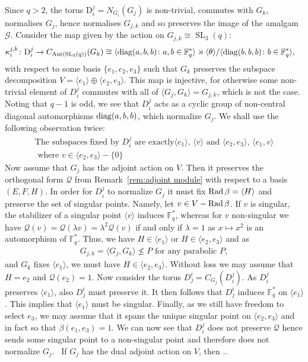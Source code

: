 \documentclass[12pt]{amsart}
\theoremstyle{definition}
\newcommand{\red}[1]{\,{\color{red} #1}\,}
\newcommand{\cQ}{{\mathcal Q}}
\newcommand{\Aut}{\mathop{\rm Aut}\nolimits}
\newcommand{\diag}{\mathop{\rm diag}\nolimits}
\newcommand{\Rad}{\mathop{\rm Rad}\nolimits}
\DeclareMathOperator{\SL}{SL}
\newcommand{\FF}{{\mathbb F}}
\newcommand{\comp}[1]{{\mathrm{#1}}}
\newcommand{\compG}{{{G}}}
\newcommand{\amG}{{\mathscr{G}}}
\begin{document}
Since $q>2$, the torus $\comp{D}_i^j=N_{\compG_{i}}(\compG_{j})$ is non-trivial, commutes with $\compG_{k}$, normalises $\compG_j$, hence normalises $\compG_{j,k}$ and so preserves the image of the amalgam $\amG$.
Consider the map given by the action on $\compG_{j,k}\cong \SL_3(q)$:
\begin{align*}
\kappa_i^{j,k}\colon \comp{D}_i^j & \to C_{\Aut(\SL_3(q))}(\compG_k) \cong  \langle \diag(a,b,b)\colon a,b\in \FF_q^*\rangle\rtimes \langle \theta \rangle/\langle \diag(b,b,b)\colon b\in \FF_q^*\rangle,
\end{align*}
with respect to some basis $\{e_1,e_2,e_3\}$ such that $\compG_k$ preserves the subspace decomposition $V=\langle e_1\rangle\oplus \langle e_2,e_3\rangle$.
This map is injective, for otherwise some non-trivial element of $D_i^j$ commutes with all of $\langle \compG_j,\compG_k\rangle=\compG_{j,k}$, which is not the case. Noting that $q-1$ is odd, we see that 
 $D_i^j$ acts as a cyclic group of non-central diagonal automorphisms $\diag(a,b,b)$, which normalize $\compG_j$.
We shall use the following observation twice:
\begin{align}
\mbox{The subspaces fixed by  $D_i^j$ are exactly
$\langle e_1\rangle$, $\langle v\rangle$  and 
 $\langle e_2,e_3\rangle$, $\langle e_1,v\rangle$} 
 \label{eqn:D_i^j fixed points and lines}\\
  \mbox{ where $v\in \langle e_2,e_3\rangle-\{0\}$} \nonumber
 \end{align}
Now assume that $\compG_j$ has the adjoint action on $V$.
Then it preserves the orthogonal form $\cQ$ from Remark~\ref{rem:adjoint module} with respect to a basis $(E,F,H)$.
In order for $D_i^j$ to normalize $\compG_j$ it must fix $\Rad \beta=\langle H\rangle$
 and preserve the set of singular points.
Namely, let $v\in V-\Rad\beta$.
If $v$ is singular, the stabilizer of a singular point $\langle v\rangle$ induces $\FF_q^*$, whereas
 for $v$ non-singular we have $\cQ(v)=\cQ(\lambda v)=\lambda^2\cQ(v)$ if and only if $\lambda=1$ as $x\mapsto x^2$ is an automorphism of $\FF_q^*$.
 Thus, we have $H\in \langle e_1\rangle$ or $H\in\langle e_2,e_3\rangle$ and as
\begin{align}
\compG_{j,k}=\langle \compG_j, \compG_k\rangle\not\le P\mbox{ for any parabolic }P,\label{eqn:not in parabolic}
\end{align}
 and $\compG_k$ fixes $\langle e_1\rangle$, we must have $H\in \langle e_2,e_3\rangle$. 
Without loss we may assume that $H=e_2$ and $\cQ(e_2)=1$.
Now consider the torus $D_j^i=C_{\compG_j}(D_i^j)$. As $D_i^j$ preserves $\langle e_1\rangle$, also 
 $D_j^i$ must preserve it. It then follows that $D_j^i$ induces $\FF_q^*$ on $\langle e_1\rangle$.
This implies that $\langle e_1\rangle$ must be singular.
Finally, as we still have freedom to select $e_3$, we may assume that it spans the unique singular point on $\langle e_2,e_3\rangle$ and in fact so that $\beta(e_1,e_3)=1$.
We can now see that $D_i^j$ does not preserve $\cQ$ hence sends some singular point to a non-singular point and therefore does not normalize $\compG_j$. 
\red{If $\compG_j$ has the dual adjoint action on $V$, then ..}
\end{document}
